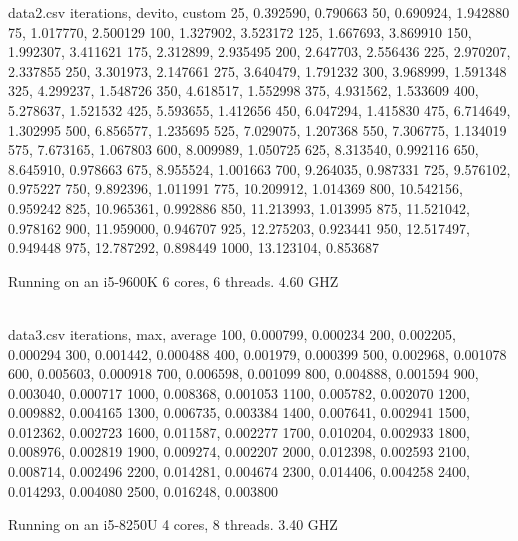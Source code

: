 \documentclass{article}
\begin{document}
\begin{filecontents*}{data2.csv}
	iterations, devito, custom
	25, 0.392590, 0.790663
	50, 0.690924, 1.942880
	75, 1.017770, 2.500129
	100, 1.327902, 3.523172
	125, 1.667693, 3.869910
	150, 1.992307, 3.411621
	175, 2.312899, 2.935495
	200, 2.647703, 2.556436
	225, 2.970207, 2.337855
	250, 3.301973, 2.147661
	275, 3.640479, 1.791232
	300, 3.968999, 1.591348
	325, 4.299237, 1.548726
	350, 4.618517, 1.552998
	375, 4.931562, 1.533609
	400, 5.278637, 1.521532
	425, 5.593655, 1.412656
	450, 6.047294, 1.415830
	475, 6.714649, 1.302995
	500, 6.856577, 1.235695
	525, 7.029075, 1.207368
	550, 7.306775, 1.134019
	575, 7.673165, 1.067803
	600, 8.009989, 1.050725
	625, 8.313540, 0.992116
	650, 8.645910, 0.978663
	675, 8.955524, 1.001663
	700, 9.264035, 0.987331
	725, 9.576102, 0.975227
	750, 9.892396, 1.011991
	775, 10.209912, 1.014369
	800, 10.542156, 0.959242
	825, 10.965361, 0.992886
	850, 11.213993, 1.013995
	875, 11.521042, 0.978162
	900, 11.959000, 0.946707
	925, 12.275203, 0.923441
	950, 12.517497, 0.949448
	975, 12.787292, 0.898449
	1000, 13.123104, 0.853687
\end{filecontents*}
Running on an i5-9600K 6 cores, 6 threads. 4.60 GHZ \\ \\

\begin{filecontents*}{data3.csv}
	iterations, max, average
	100, 0.000799, 0.000234
	200, 0.002205, 0.000294
	300, 0.001442, 0.000488
	400, 0.001979, 0.000399
	500, 0.002968, 0.001078
	600, 0.005603, 0.000918
	700, 0.006598, 0.001099
	800, 0.004888, 0.001594
	900, 0.003040, 0.000717
	1000, 0.008368, 0.001053
	1100, 0.005782, 0.002070
	1200, 0.009882, 0.004165
	1300, 0.006735, 0.003384
	1400, 0.007641, 0.002941
	1500, 0.012362, 0.002723
	1600, 0.011587, 0.002277
	1700, 0.010204, 0.002933
	1800, 0.008976, 0.002819
	1900, 0.009274, 0.002207
	2000, 0.012398, 0.002593
	2100, 0.008714, 0.002496
	2200, 0.014281, 0.004674
	2300, 0.014406, 0.004258
	2400, 0.014293, 0.004080
	2500, 0.016248, 0.003800
\end{filecontents*}
Running on an i5-8250U 4 cores, 8 threads. 3.40 GHZ \\ \\



 
\end{document}
